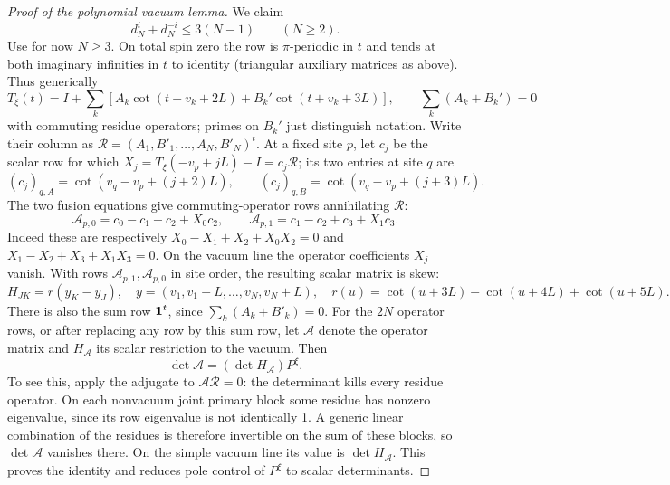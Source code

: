 \begin{proof}[Proof of the polynomial vacuum lemma]
We claim
\begin{equation}
 d_N^i+d_N^{-i}\le 3(N-1)\qquad(N\ge 2).                           \label{eq:legacy-P-12}
\end{equation}
Use for now \(N\ge3\). On total spin zero the row is \(\pi\)-periodic in \(t\) and tends at both imaginary infinities in \(t\) to identity (triangular auxiliary matrices as above). Thus generically
\[
 T_\xi(t)=I+\sum_k [A_k\cot(t+v_k+2L)+B_k'\cot(t+v_k+3L)],\qquad
 \sum_k(A_k+B_k')=0
\]
with commuting residue operators; primes on \(B_k'\) just distinguish notation. Write their column as \(\mathcal R=(A_1,B'_1,\ldots,A_N,B'_N)^t\). At a fixed site \(p\), let \(c_j\) be the scalar row for which \(X_j=T_\xi(-v_p+jL)-I=c_j\mathcal R\); its two entries at site \(q\) are
\[
 (c_j)_{q,A}=\cot(v_q-v_p+(j+2)L),\qquad
 (c_j)_{q,B}=\cot(v_q-v_p+(j+3)L).
\]
The two fusion equations give commuting-operator rows annihilating \(\mathcal R\):
\[
 \mathcal A_{p,0}=c_0-c_1+c_2+X_0c_2,\qquad
 \mathcal A_{p,1}=c_1-c_2+c_3+X_1c_3.
\]
Indeed these are respectively \(X_0-X_1+X_2+X_0X_2=0\) and \(X_1-X_2+X_3+X_1X_3=0\). On the vacuum line the operator coefficients \(X_j\) vanish. With rows \(\mathcal A_{p,1},\mathcal A_{p,0}\) in site order, the resulting scalar matrix is skew:
\[
 H_{JK}=r(y_K-y_J),\quad y=(v_1,v_1+L,\ldots,v_N,v_N+L),\quad
 r(u)=\cot(u+3L)-\cot(u+4L)+\cot(u+5L).
\]
There is also the sum row \({\bf1}^t\), since \(\sum_k(A_k+B'_k)=0\). For the \(2N\) operator rows, or after replacing any row by this sum row, let \(\mathcal A\) denote the operator matrix and \(H_{\mathcal A}\) its scalar restriction to the vacuum. Then
\[
 \det\mathcal A=(\det H_{\mathcal A})P^\xi.
\]
To see this, apply the adjugate to \(\mathcal A\mathcal R=0\): the determinant kills every residue operator. On each nonvacuum joint primary block some residue has nonzero eigenvalue, since its row eigenvalue is not identically 1. A generic linear combination of the residues is therefore invertible on the sum of these blocks, so \(\det\mathcal A\) vanishes there. On the simple vacuum line its value is \(\det H_{\mathcal A}\). This proves the identity and reduces pole control of \(P^\xi\) to scalar determinants.


\end{proof}
